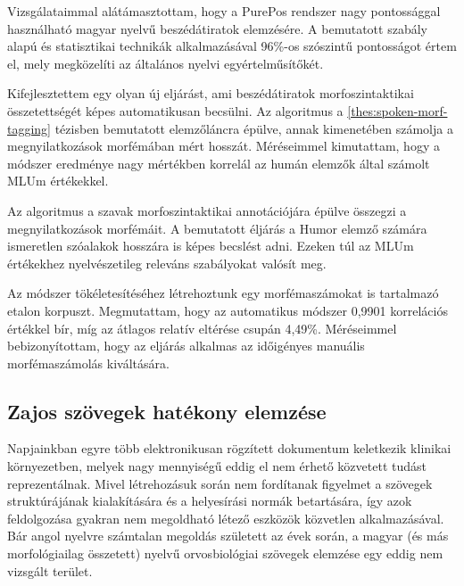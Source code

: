Vizsgálataimmal alátámasztottam, hogy a PurePos rendszer nagy pontossággal használható magyar nyelvű beszédátiratok elemzésére. 
A bemutatott szabály alapú és statisztikai technikák alkalmazásával 96\%-os szószintű pontosságot értem el, mely megközelíti az általános nyelvi egyértelműsítőkét.


\thesisline%


\begin{core}
\begin{thesis}
\label{thes:mlu-estimation}
Kifejlesztettem egy olyan új eljárást, ami beszédátiratok morfoszintaktikai összetettségét képes automatikusan becsülni.
Az algoritmus a \ref{thes:spoken-morf-tagging} tézisben bemutatott elemzőláncra épülve, annak kimenetében számolja a megnyilatkozások morfémában mért hosszát. 
Méréseimmel kimutattam, hogy a módszer eredménye nagy mértékben korrelál az humán elemzők által számolt MLUm értékekkel.
\end{thesis}

\begin{pub}
\cite{Matyus2014,Orosz2014c}
\end{pub}
\end{core}

Az algoritmus a szavak morfoszintaktikai annotációjára épülve összegzi a megnyilatkozások morfémáit.
A bemutatott éljárás a Humor elemző számára ismeretlen szóalakok hosszára is képes becslést adni.
Ezeken túl az MLUm értékekhez nyelvészetileg releváns szabályokat valósít meg.

Az módszer tökéletesítéséhez létrehoztunk egy morfémaszámokat is tartalmazó etalon korpuszt. 
Megmutattam, hogy az automatikus módszer 0,9901 korrelációs értékkel bír, míg az átlagos relatív eltérése csupán 4,49\%. 
Méréseimmel bebizonyítottam, hogy az eljárás alkalmas az időigényes manuális morfémaszámolás kiváltására.

\subsection{Zajos szövegek hatékony elemzése}
\label{thes:clin}

Napjainkban egyre több elektronikusan rögzített dokumentum keletkezik klinikai környezetben, melyek nagy mennyiségű eddig el nem érhető közvetett tudást reprezentálnak. 
Mivel létrehozásuk során nem fordítanak figyelmet a szövegek struktúrájának kialakítására és a helyesírási normák betartására, így azok feldolgozása gyakran nem megoldható létező eszközök közvetlen alkalmazásával. 
Bár angol nyelvre számtalan megoldás született az évek során, a magyar (és más morfológiailag összetett) nyelvű orvosbiológiai szövegek elemzése egy eddig nem vizsgált terület.

